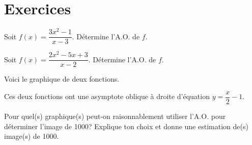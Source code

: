\documentclass[a4paper,12pt]{report}
\begin{document}
\section{Exercices}
\label{sec:org35f4a2f}
\begin{exercice}
Soit \(f(x)=\dfrac{3x^2-1}{x-3}\). Détermine l'A.O. de \(f\).
\end{exercice}

\begin{exercice}
Soit \(f(x)=\dfrac{2x^2-5x+3}{x-2}\). Détermine l'A.O. de \(f\).
\end{exercice}

\begin{exercice}
Voici le graphique de deux fonctions.



Ces deux fonctions ont une asymptote oblique à droite d'équation
  \(y=\dfrac{x}{2}-1\).

Pour quel(s) graphique(s) peut-on raisonnablement utiliser
l'A.O. pour déterminer l'image de 1000? Explique ton choix et donne
une estimation de(s) image(s) de 1000.
\end{exercice}
\end{document}
